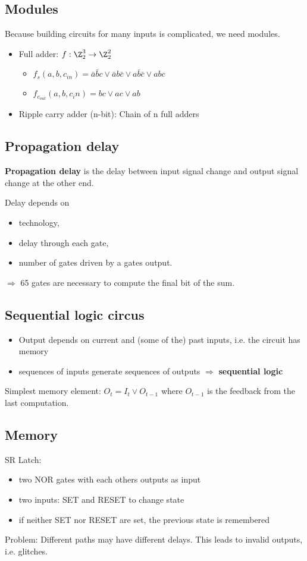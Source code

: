 \documentclass{article}
\begin{document}
\subsection{Modules}
Because building circuits for many inputs is complicated, we need modules.
\begin{itemize}
	\item Full adder: $f:\Z_2^3\to\Z_2^2$\begin{itemize}
		\item $f_s(a,b,c_{in})=\bar{a}\bar{b}c\vee \bar{a}b\bar{c} \vee a\bar{b}\bar{c} \vee abc$
		\item $f_{c_{out}}(a,b,c_in)=bc\vee ac\vee ab$
	\end{itemize}
	\item Ripple carry adder (n-bit): Chain of n full adders
\end{itemize}
\subsection{Propagation delay}
\begin{definition}
	\textbf{Propagation delay} is the delay between input signal
	change and output signal change at the other end.
\end{definition}
Delay depends on
\begin{itemize}
	\item technology,
	\item delay through each gate,
	\item number of gates driven by a gates output.
\end{itemize}
$\Rightarrow$ 65 gates are necessary to compute the final bit of the sum.
\subsection{Sequential logic circus}
\begin{itemize}
	\item Output depends on current and (some of the) past inputs, i.e. the circuit has memory
	\item sequences of inputs generate sequences of outputs $\Rightarrow$ \textbf{sequential logic}
\end{itemize}
Simplest memory element: $O_t = I_t \vee O_{t-1}$ where $O_{t-1}$ is the feedback from the last
computation. 
\subsection{Memory}
SR Latch:
\begin{itemize}
	\item two NOR gates with each others outputs as input
	\item two inputs: SET and RESET to change state
	\item if neither SET nor RESET are set, the previous state is remembered
\end{itemize}
Problem: Different paths may have different delays. This leads to invalid outputs, i.e. glitches.
\end{document}
